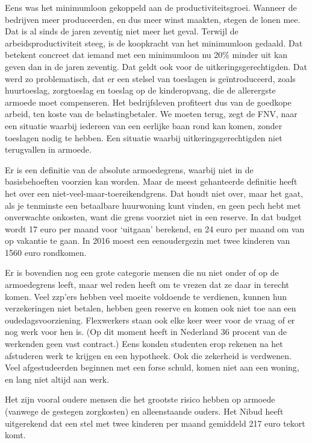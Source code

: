 Eens was het minimumloon gekoppeld aan de productiviteitsgroei. Wanneer
de bedrijven meer produceerden, en dus meer winst maakten, stegen de
lonen mee. Dat is al sinds de jaren zeventig niet meer het geval.
Terwijl de arbeidsproductiviteit steeg, is de koopkracht van het
minimumloon gedaald. Dat betekent concreet dat iemand met een
minimumloon nu 20\% minder uit kan geven dan in de jaren zeventig. Dat
geldt ook voor de uitkeringsgerechtigden. Dat werd zo problematisch, dat
er een stelsel van toeslagen is geïntroduceerd, zoals huurtoeslag,
zorgtoeslag en toeslag op de kinderopvang, die de allerergste armoede
moet compenseren. Het bedrijfsleven profiteert dus van de goedkope
arbeid, ten koste van de belastingbetaler. We moeten terug, zegt de FNV,
naar een situatie waarbij iedereen van een eerlijke baan rond kan komen,
zonder toeslagen nodig te hebben. Een situatie waarbij
uitkeringsgerechtigden niet terugvallen in armoede.

Er is een definitie van de absolute armoedegrens, waarbij niet in de
basisbehoeften voorzien kan worden. Maar de meest gehanteerde definitie
heeft het over een niet-veel-maar-toereikendgrens. Dat houdt niet over,
maar het gaat, als je tenminste een betaalbare huurwoning kunt vinden,
en geen pech hebt met onverwachte onkosten, want die grens voorziet niet
in een reserve. In dat budget wordt 17 euro per maand voor `uitgaan'
berekend, en 24 euro per maand om van op vakantie te gaan. In 2016 moest
een eenoudergezin met twee kinderen van 1560 euro rondkomen.

Er is bovendien nog een grote categorie mensen die nu niet onder of op
de armoedegrens leeft, maar wel reden heeft om te vrezen dat ze daar in
terecht komen. Veel zzp'ers hebben veel moeite voldoende te verdienen,
kunnen hun verzekeringen niet betalen, hebben geen reserve en komen ook
niet toe aan een oudedagsvoorziening. Flexwerkers staan ook elke keer
weer voor de vraag of er nog werk voor hen is. (Op dit moment heeft in
Nederland 36 procent van de werkenden geen vast contract.) Eens konden
studenten erop rekenen na het afstuderen werk te krijgen en een
hypotheek. Ook die zekerheid is verdwenen. Veel afgestudeerden beginnen
met een forse schuld, komen niet aan een woning, en lang niet altijd aan
werk.

Het zijn vooral oudere mensen die het grootste risico hebben op armoede
(vanwege de gestegen zorgkosten) en alleenstaande ouders. Het Nibud
heeft uitgerekend dat een stel met twee kinderen per maand gemiddeld 217
euro tekort komt.

